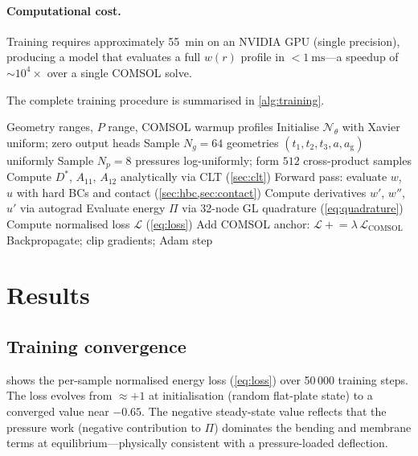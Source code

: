 \documentclass[review,12pt]{elsarticle}
\begin{document}
\paragraph{Computational cost.}
Training requires approximately \SI{55}{\minute} on an NVIDIA GPU (single
precision), producing a model that evaluates a full $w(r)$ profile in
$<\SI{1}{\milli\second}$—a speedup of $\sim 10^4\times$ over a single COMSOL
solve.

The complete training procedure is summarised in \cref{alg:training}.

\begin{algorithm}[htb]
\caption{MEMSRitz training procedure}
\label{alg:training}
\begin{algorithmic}[1]
\Require Geometry ranges, $P$ range, COMSOL warmup profiles
\State Initialise $\mathcal{N}_\theta$ with Xavier uniform; zero output heads
    \State Sample $N_g=64$ geometries $(t_1,t_2,t_3,a,a_\mathrm{g})$ uniformly
    \State Sample $N_p=8$ pressures log-uniformly; form $512$ cross-product samples
    \State Compute $D^*$, $A_{11}$, $A_{12}$ analytically via CLT (\cref{sec:clt})
    \State Forward pass: evaluate $w$, $u$ with hard BCs and contact (\cref{sec:hbc,sec:contact})
    \State Compute derivatives $w'$, $w''$, $u'$ via autograd
    \State Evaluate energy $\Pi$ via 32-node GL quadrature (\cref{eq:quadrature})
    \State Compute normalised loss $\mathcal{L}$ (\cref{eq:loss})
        \State Add COMSOL anchor: $\mathcal{L} \mathrel{+}= \lambda\,\mathcal{L}_\mathrm{COMSOL}$
    \EndIf
    \State Backpropagate; clip gradients; Adam step
\EndFor
\end{algorithmic}
\end{algorithm}

\section{Results}
\label{sec:results}

\subsection{Training convergence}
\label{sec:training_convergence}

 shows the per-sample normalised energy loss
(\cref{eq:loss}) over 50\,000 training steps. The loss evolves from
$\approx +1$ at initialisation (random flat-plate state) to a converged value
near $-0.65$. The negative steady-state value reflects that the pressure work
(negative contribution to $\Pi$) dominates the bending and membrane terms at
equilibrium—physically consistent with a pressure-loaded deflection.
\end{document}
